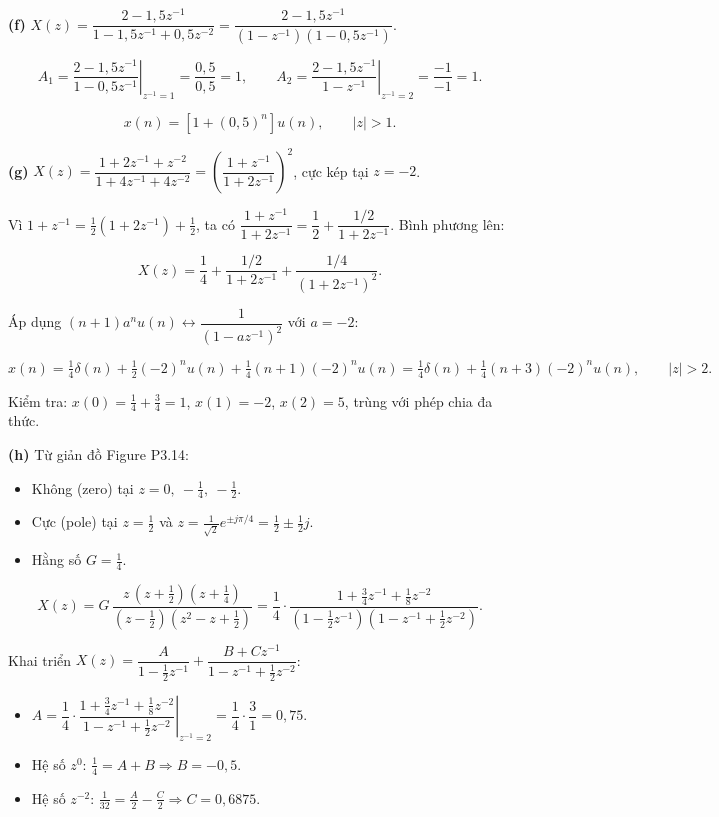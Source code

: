 \documentclass[12pt,a4paper]{article}
\begin{document}
\textbf{(f)}
\(X(z)=\dfrac{2-1{,}5z^{-1}}{1-1{,}5z^{-1}+0{,}5z^{-2}}=\dfrac{2-1{,}5z^{-1}}{(1-z^{-1})(1-0{,}5z^{-1})}\).

\[A_1=\left.\frac{2-1{,}5z^{-1}}{1-0{,}5z^{-1}}\right|_{z^{-1}=1}=\frac{0{,}5}{0{,}5}=1,\qquad A_2=\left.\frac{2-1{,}5z^{-1}}{1-z^{-1}}\right|_{z^{-1}=2}=\frac{-1}{-1}=1.\]

\[x(n)=\left[1+(0{,}5)^n\right]u(n),\qquad |z|>1.\]

\textbf{(g)}
\(X(z)=\dfrac{1+2z^{-1}+z^{-2}}{1+4z^{-1}+4z^{-2}}=\left(\dfrac{1+z^{-1}}{1+2z^{-1}}\right)^2\),
cực kép tại \(z=-2\).

Vì \(1+z^{-1}=\tfrac12(1+2z^{-1})+\tfrac12\), ta có
\(\dfrac{1+z^{-1}}{1+2z^{-1}}=\dfrac12+\dfrac{1/2}{1+2z^{-1}}\). Bình
phương lên:

\[X(z)=\frac14+\frac{1/2}{1+2z^{-1}}+\frac{1/4}{(1+2z^{-1})^2}.\]

Áp dụng \((n+1)a^nu(n)\leftrightarrow\dfrac{1}{(1-az^{-1})^2}\) với
\(a=-2\):

\[x(n)=\tfrac14\delta(n)+\tfrac12(-2)^nu(n)+\tfrac14(n+1)(-2)^nu(n)=\tfrac14\delta(n)+\tfrac14(n+3)(-2)^nu(n),\qquad |z|>2.\]

Kiểm tra: \(x(0)=\tfrac14+\tfrac34=1\), \(x(1)=-2\), \(x(2)=5\), trùng
với phép chia đa thức.

\textbf{(h)} Từ giản đồ Figure P3.14:

\begin{itemize}
\item
  Không (zero) tại \(z=0,\ -\tfrac14,\ -\tfrac12\).
\item
  Cực (pole) tại \(z=\tfrac12\) và
  \(z=\tfrac{1}{\sqrt2}e^{\pm j\pi/4}=\tfrac12\pm\tfrac12j\).
\item
  Hằng số \(G=\tfrac14\).
\end{itemize}

\[X(z)=G\,\frac{z\,(z+\frac12)(z+\frac14)}{(z-\frac12)(z^2-z+\frac12)}=\frac14\cdot\frac{1+\frac34z^{-1}+\frac18z^{-2}}{(1-\frac12z^{-1})(1-z^{-1}+\frac12z^{-2})}.\]

Khai triển
\(X(z)=\dfrac{A}{1-\frac12z^{-1}}+\dfrac{B+Cz^{-1}}{1-z^{-1}+\frac12z^{-2}}\):

\begin{itemize}
\item
  \(A=\left.\dfrac14\cdot\dfrac{1+\frac34z^{-1}+\frac18z^{-2}}{1-z^{-1}+\frac12z^{-2}}\right|_{z^{-1}=2}=\dfrac14\cdot\dfrac{3}{1}=0{,}75\).
\item
  Hệ số \(z^0\): \(\tfrac14=A+B\Rightarrow B=-0{,}5\).
\item
  Hệ số \(z^{-2}\):
  \(\tfrac{1}{32}=\tfrac{A}{2}-\tfrac{C}{2}\Rightarrow C=0{,}6875\).
\end{itemize}
\end{document}
